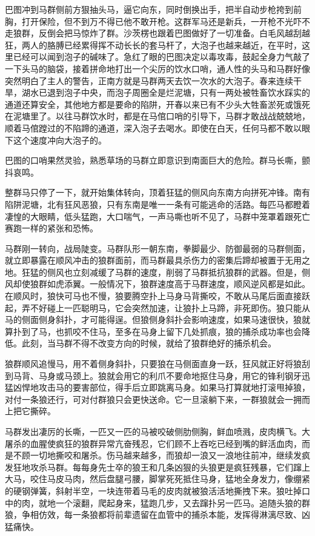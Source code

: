 \par 巴图冲到马群侧前方狠抽头马，逼它向东，同时倒换出手，把半自动步枪挎到前胸，打开保险，但不到万不得已他不敢开枪。这群军马还是新兵，一开枪不光吓不走狼群，反倒会把马惊炸了群。沙茨楞也跟着巴图做好了一切准备。白毛风越刮越狂，两人的胳膊已经累得挥不动长长的套马杆了，大泡子也越来越近，在平时，这里已经可以闻到泡子的碱味了。急红了眼的巴图决定以毒攻毒，鼓起全身力气敲了一下头马的脑袋，接着拼命地打出一个尖厉的饮水口哨，通人性的头马和马群好像突然明白了主人的警告，正南方就是马群两天去饮一次水的大泡子。春来连续干旱，湖水已退到泡子中央，而泡子周圈全是烂泥塘，只有一两处被牲畜饮水踩实的通道还算安全，其他地方都是要命的陷阱，开春以来已有不少头大牲畜淤死或饿死在泥塘里了。以往马群饮水时，都是在马倌口哨的引导下，马群才敢战战兢兢地，顺着马倌蹚过的不陷蹄的通道，深入泡子去喝水。即使在白天，任何马都不敢以眼下这个速度冲向大泡子的。
\par 巴图的口哨果然灵验，熟悉草场的马群立即意识到南面巨大的危险。群马长嘶，颤抖哀鸣。
\par 整群马只停了一下，就开始集体转向，顶着狂猛的侧风向东南方向拼死冲锋。南有陷阱泥塘，北有狂风恶狼，只有东南是唯一一条有可能逃命的活路。每匹马都瞪着凄惶的大眼睛，低头猛跑，大口喘气，一声马嘶也听不见了，马群中笼罩着跟死亡赛跑一样的紧张和恐怖。
\par 马群刚一转向，战局陡变。马群队形一朝东南，拳脚最少、防御最弱的马群侧面，就立即暴露在顺风冲击的狼群面前，而马群最具杀伤力的密集后蹄却被置于无用之地。狂猛的侧风也立刻减缓了马群的速度，削弱了马群抵抗狼群的武器。但是，侧风却使狼群如虎添翼。一般情况下，狼群速度高于马群速度，顺风逆风都是如此。在顺风时，狼快可马也不慢，狼要腾空扑上马身马背撕咬，不敢从马尾后面直接跃起，弄不好碰上一匹聪明马，它会突然加速，让狼扑上马蹄，非死即伤。狼只能从马的侧面侧身斜扑，才可能得逞。但狼侧身斜扑会影响速度，如果马速很快，狼就算扑到了马，也抓咬不住马，至多在马身上留下几处抓痕，狼的捕杀成功率也会降低。此刻，当马群不得不改变方向的时候，就给了狼群绝好的捕杀机会。
\par 狼群顺风追慢马，用不着侧身斜扑，只要狼在马侧面直身一跃，狂风就正好将狼刮到马背、马身或马颈上。狼就会用它的利爪不要命地抠住马身，用它的锋利钢牙迅猛凶悍地攻击马的要害部位，得手后立即跳离马身。如果马打算就地打滚甩掉狼，对付一条狼还行，可对付群狼只会更快送命。它一旦滚躺下来，一群狼就会一拥而上把它撕碎。
\par 马群发出凄厉的长嘶，一匹又一匹的马被咬破侧肋侧胸，鲜血喷溅，皮肉横飞。大屠杀的血腥使疯狂的狼群异常亢奋残忍，它们顾不上吞吃已经到嘴的鲜活血肉，而是不顾一切地撕咬和屠杀。伤马越来越多，而狼却一浪又一浪地往前冲，继续发疯发狂地攻杀马群。每每身先士卒的狼王和几条凶狠的头狼更是疯狂残暴，它们蹿上大马，咬住马皮马肉，然后盘腿弓腰，脚掌死死抵住马身，猛地全身发力，像绷紧的硬钢弹簧，斜射半空，一块连带着马毛的皮肉就被狼活活地撕拽下来。狼吐掉口中的肉，就地一个滚翻，爬起身来，猛跑几步，又去蹿扑另一匹马。追随头狼的群狼，争相仿效，每一条狼都将前辈遗留在血管中的捕杀本能，发挥得淋漓尽致、凶猛痛快。
